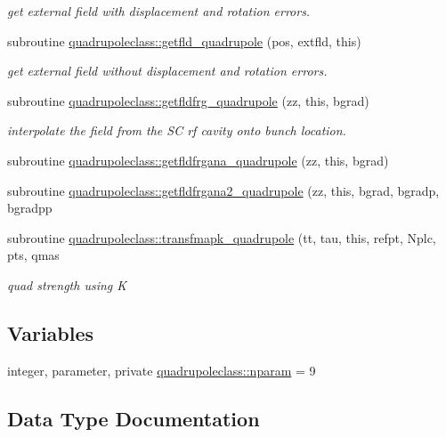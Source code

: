 \begin{DoxyCompactItemize}
\begin{DoxyCompactList}\small\item\em get external field with displacement and rotation errors. \end{DoxyCompactList}\item 
subroutine \mbox{\hyperlink{namespacequadrupoleclass_a1d1bf0b4ea88a1cd0c0832a178fc80e5}{quadrupoleclass\+::getfld\+\_\+quadrupole}} (pos, extfld, this)
\begin{DoxyCompactList}\small\item\em get external field without displacement and rotation errors. \end{DoxyCompactList}\item 
subroutine \mbox{\hyperlink{namespacequadrupoleclass_a28a961157d94669d59f8c6f024995899}{quadrupoleclass\+::getfldfrg\+\_\+quadrupole}} (zz, this, bgrad)
\begin{DoxyCompactList}\small\item\em interpolate the field from the SC rf cavity onto bunch location. \end{DoxyCompactList}\item 
subroutine \mbox{\hyperlink{namespacequadrupoleclass_aac2c756ddd587ca842555670b0ad16b3}{quadrupoleclass\+::getfldfrgana\+\_\+quadrupole}} (zz, this, bgrad)
\item 
subroutine \mbox{\hyperlink{namespacequadrupoleclass_ab1abe8916ad3dace3e5d1373da4688ac}{quadrupoleclass\+::getfldfrgana2\+\_\+quadrupole}} (zz, this, bgrad, bgradp, bgradpp
\item 
subroutine \mbox{\hyperlink{namespacequadrupoleclass_a0a62a19a637c00cb1d985698e111b415}{quadrupoleclass\+::transfmapk\+\_\+quadrupole}} (tt, tau, this, refpt, Nplc, pts, qmas
\begin{DoxyCompactList}\small\item\em quad strength using K \end{DoxyCompactList}\end{DoxyCompactItemize}
\subsection*{Variables}
\begin{DoxyCompactItemize}
\item 
integer, parameter, private \mbox{\hyperlink{namespacequadrupoleclass_a8eba81bd9796e431c21d0f46260b0c6c}{quadrupoleclass\+::nparam}} = 9
\end{DoxyCompactItemize}


\subsection{Data Type Documentation}
\label{structquadrupoleclass_1_1quadrupole}
